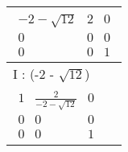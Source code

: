 \begin{longtable}{p{10cm}}
    $\displaystyle\begin{matrix}
                          -2 - \sqrt{12} & 2 & 0 \\
                          0              & 0 & 0 \\
                          0              & 0 & 1
                      \end{matrix}$                                                   \\\hline
    I : (-2 - $\sqrt{12}$)                                                                 \\\hline\pagebreak[0]
    $\displaystyle\begin{matrix}
                          1 & \frac{2}{-2-\sqrt{12}} & 0 \\
                          0 & 0                      & 0 \\
                          0 & 0                      & 1
                      \end{matrix}$                              \\\hline

\end{longtable}

